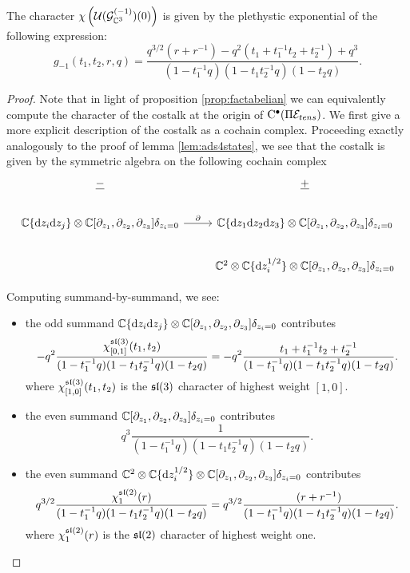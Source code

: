 \begin{prop}
\label{prop:6done}
The character $\chi \left ( \mathcal{U} (\mathcal{G}^{(-1)}_{\mathbb{C}^3} ) (0)\right )$ is given by the plethystic exponential of the following expression:
\begin{equation}\label{eqn:6done}
g_{-1} (t_1,t_2,r,q) = \frac{q^{3/2}(r + r^{-1}) - q^2(t_1 + t_1^{-1} t_2 + t_2^{-1} ) + q^3}{(1-t_1^{-1}q) (1-t_1 t_2^{-1} q) (1-t_2 q)} .
\end{equation}
\end{prop}
\begin{proof}
Note that in light of proposition \ref{prop:factabelian} we can equivalently compute the character of the costalk at the origin of ${\mathrm{C}}^\bullet (\Pi \mathcal{E}_{tens})$. We first give a more explicit description of the costalk as a cochain complex. Proceeding exactly analogously to the proof of lemma \ref{lem:ads4states}, we see that the costalk is given by the symmetric algebra on the following cochain complex
\[
\begin{tikzcd}
\ul{-} & \ul{+}\\
\C\{\d z_i\d z_j\} \otimes \C [\del_{z_1}, \del_{z_2}, \del_{z_3}]\delta_{z_i = 0} \ar[r,"\del"] & \C\{\d z_1\d z_2\d z_3\} \otimes \C [\del_{z_1}, \del_{z_2}, \del_{z_3}]\delta_{z_i = 0} \\
& \C^2\otimes \C\{\d z_i^{1/2}\} \otimes \C [\del_{z_1}, \del_{z_2}, \del_{z_3}]\delta_{z_i = 0} 
\end{tikzcd}
\]

Computing summand-by-summand, we see:
\begin{itemize}
\item the odd summand $\mathbb{C}\{\mathrm{d} z_i\mathrm{d} z_j\} \otimes \mathbb{C} [\partial_{z_1}, \partial_{z_2}, \partial_{z_3}]\delta_{z_i = 0}$ contributes
\[
- q^2 \frac{\chi^{\mathfrak{sl}(3)}_{[0,1]}(t_1,t_2)}{(1-t_1^{-1}q) (1-t_1 t_2^{-1} q) (1-t_2 q)} = - q^2 \frac{t_1  + t_1^{-1} t_2  + t_2^{-1} }{(1-t_1^{-1}q) (1-t_1 t_2^{-1} q) (1-t_2 q)}.
\]
where $\chi^{\mathfrak{sl}(3)}_{[1,0]}(t_1,t_2)$ is the $\mathfrak{sl}(3)$ character of highest weight $[1,0]$.
\item the even summand $\mathbb{C} [\partial_{z_1}, \partial_{z_2}, \partial_{z_3}]\delta_{z_i = 0}$ contributes
\[
q^3 \frac{1}{(1-t_1^{-1}q) (1-t_1 t_2^{-1} q) (1-t_2 q)}.
\]
\item the even summand $\mathbb{C}^2\otimes \mathbb{C}\{\mathrm{d} z_i^{1/2}\} \otimes \mathbb{C} [\partial_{z_1}, \partial_{z_2}, \partial_{z_3}]\delta_{z_i = 0}$ contributes
\[
q^{3/2} \frac{\chi_{1}^{\mathfrak{sl}(2)} (r)}{(1-t_1^{-1}q) (1-t_1 t_2^{-1} q) (1-t_2 q)} = q^{3/2}\frac{(r + r^{-1})}{(1-t_1^{-1}q) (1-t_1 t_2^{-1} q) (1-t_2 q)}.
\]
where $\chi_{1}^{\mathfrak{sl}(2)} (r)$ is the $\mathfrak{sl}(2)$ character of highest weight one.
\end{itemize}
\end{proof}

